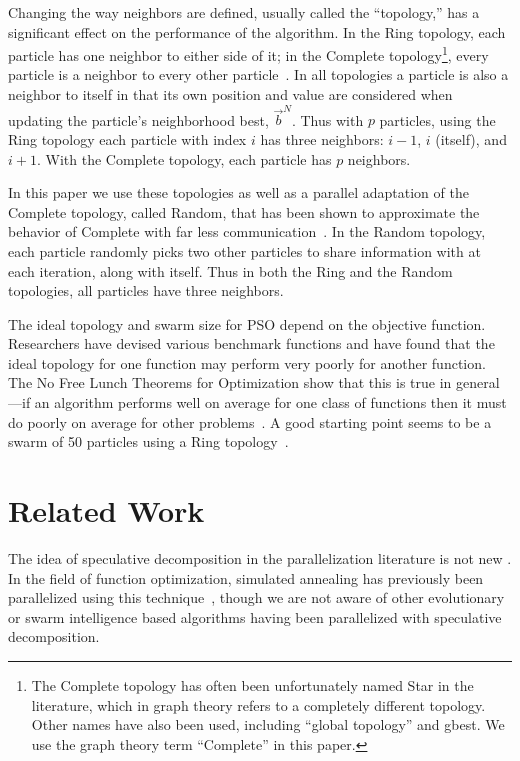 \documentclass[smallcondensed]{svjour3}
\providecommand{\neigh}{\ensuremath{N}}
\providecommand{\nbest}{\ensuremath{\Vec{b}^\neigh}}
\begin{document}
Changing the way neighbors are defined, usually called the ``topology,'' has a
significant effect on the performance of the algorithm.  In the Ring topology,
each particle has one neighbor to either side of it; in the Complete
topology\footnote{The Complete topology has often been unfortunately named Star
in the literature, which in graph theory refers to a completely different
topology.  Other names have also been used, including ``global topology'' and
gbest.  We use the graph theory term ``Complete'' in this paper.}, every
particle is a neighbor to every other
particle~\citep{bratton-2007-defining-a-standard-for-pso}.  In all topologies a
particle is also a neighbor to itself in that its own position and value are
considered when updating the particle's neighborhood best, $\nbest$.  Thus with
$p$ particles, using the Ring topology each particle with index $i$ has three
neighbors: $i-1$, $i$ (itself), and $i+1$.  With the Complete topology, each
particle has $p$ neighbors.

In this paper we use these topologies as well as a parallel adaptation of the
Complete topology, called Random, that has been shown to approximate the
behavior of Complete with far less
communication~\citep{mcnabb-2009-large-particle-swarms}.  In the Random
topology, each particle randomly picks two other particles to share information
with at each iteration, along with itself.  Thus in both the Ring and the
Random topologies, all particles have three neighbors.

The ideal topology and swarm size for PSO depend on the objective function.
Researchers have devised various benchmark functions and have found that the
ideal topology for one function may perform very poorly for another function.
The No Free Lunch Theorems for Optimization show that this is true in
general---if an algorithm performs well on average for one class of functions
then it must do poorly on average for other
problems~\citep{wolpert-1997-nfl-for-optimization}.  A good starting point
seems to be a swarm of 50 particles using a Ring
topology~\citep{bratton-2007-defining-a-standard-for-pso}.

\section{Related Work}
\label{sec:related}

The idea of speculative decomposition in the parallelization literature is not
new \citep{grama-2003-intro-to-parallel-computing}.  In the field of function
optimization, simulated annealing has previously been parallelized using this
technique~\citep{witte-1991-parallel-simulated-annealing-speculative}, though
we are not aware of other evolutionary or swarm intelligence based algorithms
having been parallelized with speculative decomposition.
\end{document}
